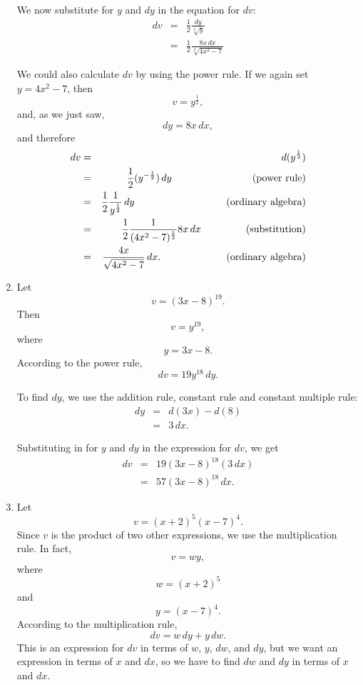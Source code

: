 \documentclass[polutonikogreek,english,twoside,openright]{article}
\newlength{\oldjot}
\begin{document}
\begin{enumerate}
We now substitute for $y$ and $dy$ in the equation for $dv$:
\setlength{\jot}{2ex}
\begin{eqnarray*}
dv & = & \frac{1}{2}\frac{dy}{\sqrt[2]{y}}  \\
& = &  \frac{1}{2}\frac{8x\,dx}{\sqrt[2]{4x^2-7}}  
 \end{eqnarray*}
\setlength{\jot}{\oldjot}



We could also calculate $dv$ by using the power rule.  If we again set $y= 4x^2 -7$, then
$$v  =  y^{\frac{1}{2}},$$
and, as we just saw,
$$dy = 8x\,dx,$$
and therefore
\setlength{\jot}{2ex}
\begin{eqnarray*}
dv & = & d(y^{\frac{1}{2}})  \\
 & = & \frac{1}{2}(y^{-\frac{1}{2}})\,dy  \mbox{\hspace{18ex} (power rule)}\\
 & = & \frac{1}{2}\frac{1}{y^{\frac{1}{2}}}\,dy \mbox{\hspace{20.6ex} (ordinary algebra)} \\
  & = & \frac{1}{2}\frac{1}{(4x^2 - 7)^{\frac{1}{2}}}8x\,dx \mbox{\hspace{9.7ex} (substitution)} \\
 & = & \frac{4x}{\sqrt{4x^2-7}}\,dx.  \mbox{\hspace{14.55ex} (ordinary algebra)}
 \end{eqnarray*}
 \setlength{\jot}{\oldjot}

\item \label{ex5} Let
$$v = (3x - 8)^{19}.$$
Then 
$$v = y^{19},$$
where 
$$y = 3x- 8.$$
According to the power rule,
$$dv = 19y^{18}\,dy.$$

To find $dy$, we use the addition rule, constant rule and constant multiple rule:
\begin{eqnarray*}
dy & = & d(3x) - d(8) \\
 & = & 3\,dx.
 \end{eqnarray*}


Substituting in for $y$ and $dy$ in the expression for $dv$, we get
\begin{eqnarray*}
dv & = & 19(3x-8)^{18}(3\,dx) \\
 & = & 57(3x - 8)^{18}\,dx.
\end{eqnarray*}

\item \label{ex6} Let 
$$v = (x+2)^5(x-7)^4.$$
Since $v$ is the product of two other expressions, we use the multiplication rule.  In fact, 
$$v = wy,$$
where 
$$w = (x+2)^5$$
and
$$y = (x-7)^4.$$
According to the multiplication rule,
$$dv = w\,dy + y\,dw.$$
This is an expression for $dv$ in terms of $w$, $y$, $dw$, and $dy$,
but we want an expression in terms of $x$ and $dx$, so we have to find
$dw$ and $dy$ in terms of $x$ and $dx$.


\end{enumerate}
\end{document}
